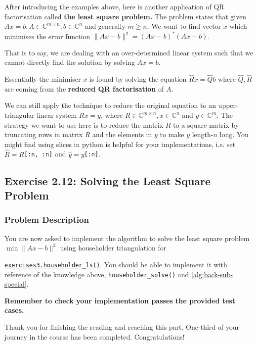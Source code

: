 \noindent After introducing the examples above, here is another application of QR factorisation called \textbf{the least square problem.} The problem states that given \(Ax = b, A \in \mathbb{C}^{m \times n}, b \in \mathbb{C}^{n}\) and generally \(m \geq n\). We want to find vector \(x\) which minimises the error function \(\|Ax - b\|^2 = (Ax - b)^{*}(Ax - b)\). \medskip

\noindent That is to say, we are dealing with an over-determined linear system such that we cannot directly find the solution by solving \(Ax = b\). \medskip

\noindent Essentially the minimiser $\overline{x}$ is found by solving the equation $\hat{R}x = \hat{Q}b$ where \(\hat{Q}, \hat{R}\) are coming from the \textbf{reduced QR factorisation} of \(A\). \medskip

\noindent We can still apply the technique to reduce the original equation to an upper-triangular linear system $Rx = y$, where $R \in \mathbb{C}^{m\times n}, x \in \mathbb{C}^{n}$ and $y \in \mathbb{C}^{m}$. The strategy we want to use here is to reduce the matrix $R$ to a square matrix by truncating rows in matrix \(R\)  and the elements in \(y\)  to make \(y\)   length-\(n\) long. You might find using slices in python is helpful for your implementations, i.e. set \(\hat{R} = R\)\texttt{[:n, :n]} and \(\hat{y} = y\)\texttt{[:n]}.


\subsection*{Exercise 2.12: Solving the Least Square Problem}
\subsubsection*{Problem Description}%
You are now asked to implement the algorithm to solve the least square problem $\min \|Ax - b\|^2$
using householder triangulation for 

\noindent \href{https://comp-lin-alg.github.io/cla_utils.html#cla_utils.exercises3.householder_ls}{\texttt{exercises3.householder\_ls()}}. You should be able to implement it with reference of the knowledge above, \texttt{householder\_solve()} and \autoref{alg:back-sub-special}. \medskip

\noindent \textbf{Remember to check your implementation passes the provided test cases.} \bigskip

\noindent Thank you for finishing the reading and reaching this part. One-third of your journey in the course has been completed. Congratulations! \medskip

